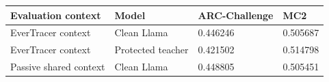 \begin{tabular}{llll}
\toprule
Evaluation context & Model & ARC-Challenge & MC2 \\
\midrule
EverTracer context & Clean Llama & 0.446246 & 0.505687 \\
EverTracer context & Protected teacher & 0.421502 & 0.514798 \\
Passive shared context & Clean Llama & 0.448805 & 0.505451 \\
\bottomrule
\end{tabular}
